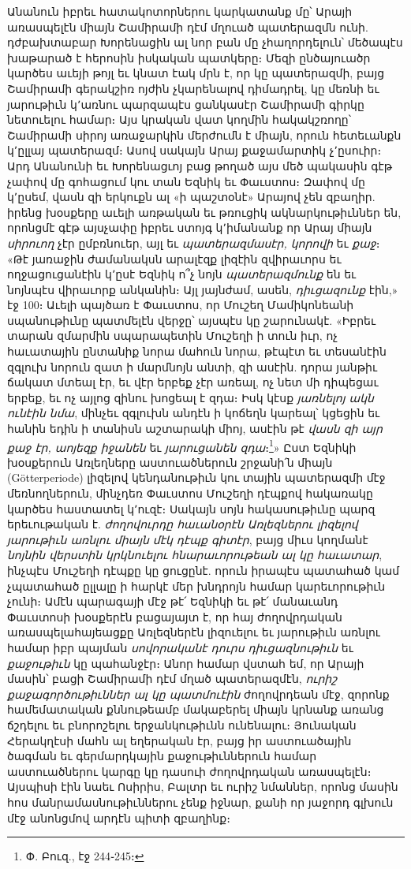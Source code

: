\documentclass{article}
\begin{document}
{Անանուն իբրեւ հատակոտորներու կարկատանք մը՝ Արայի առասպելէն միայն Շամիրամի դէմ մղուած պատերազմն ունի. դժբախտաբար Խորենացին ալ նոր բան մը չհաղորդելուն՝ մեծապէս խաթարած է հերոսին իսկական պատկերը։ Մեզի ընծայուածր կարծես աւեյի թոյլ եւ կնատ էակ մրն է, որ կը պատերազմի, բայց Շամիրամի գերակշիռ ոյժին չկարենալով դիմադրել, կը մեռնի եւ յարութիւն կ՚առնու պարզապէս ցանկասէր Շամիրամի գիրկը նետուելու համար։ Այս կրական վատ կողմին հակակշռողը՝ Շամիրամի սիրոյ առաջարկին մերժումն է միայն, որուն հետեւանքն կ՚ըլլայ պատերազմ։ Ասով սակայն Արայ քաջամարտիկ չ՚ըսուիր։ Արդ Անանունի եւ Խորենացւոյ բաց թողած այս մեծ պակասին գէթ չափով մը գոհացում կու տան Եզնիկ եւ Փաւստոս։ Զափով մը կ՚ըսեմ, վասն զի երկուքն ալ «ի պաշտօնէ» Արայով չեն զբաղիր. իրենց խօսքերը աւելի առթական եւ թռուցիկ ակնարկութիւններ են, որոնցմէ գէթ այսչափը իբրեւ ստոյգ կ՚իմանանք որ Արայ միայն \emph{սիրուող} չէր ըմբռնուեր, այլ եւ \emph{պատերազմասէր, կորովի} եւ \emph{քաջ}։ «Թէ յառաջին ժամանակսն արալէզք լիզէին զվիրաւորս եւ ողջացուցանէին կ՚ըսէ Եզնիկ ո՞չ նոյն \emph{պատերազմունք} են եւ նոյնպէս վիրաւորք անկանին։ Այլ յայնժամ, ասեն, \emph{դիւցազունք} էին,» էջ 100։ Աւելի պայծառ է Փաւստոս, որ Մուշեղ Մամիկոնեանի սպանութիւնը պատմելէն վերջը՝ այսպէս կը շարունակէ. «Իբրեւ տարան զմարմին սպարապետին Մուշեղի ի տուն իւր, ոչ հաւատային ընտանիք նորա մահուն նորա, թէպէտ եւ տեսանէին զգլուխ նորուն զատ ի մարմնոյն անտի, զի ասէին. դորա յանթիւ ճակատ մտեալ էր, եւ վէր երբեք չէր առեալ, ոչ նետ մի դիպեցաւ երբեք, եւ ոչ այլոց զինու խոցեալ է զդա։ Իսկ կէսք \emph{յառնելոյ ակն ունէին նմա}, մինչեւ զգլուխն անդէն ի կոճեղն կարեալ՝ կցեցին եւ հանին եդին ի տանիսն աշտարակի միոյ, ասէին թէ \emph{վասն զի այր քաջ էր, աոյեզք իջանեն} եւ \emph{յարուցանեն զդա}։\footnote{Փ. Բուզ., էջ 244֊245։}» Ըստ Եզնիկի խօսքերուն Առլեղները աստուածներուն շրջանի՛ն միայն (Götterperiode) լիզելով կենդանութիւն կու տային պատերազմի մէջ մեռնողներուն, մինչդեռ Փաւստոս Մուշեղի դէպքով հակառակը կարծես հաստատել կ՚ուզէ։ Սակայն սոյն հակասութիւնը պարզ երեւութական է. \emph{ժողովուրդը հաւանօրէն Առլեզներու լիզելով յարութիւն առնլու միայն մէկ դէպք գիտէր}, բայց միւս կողմանէ \emph{նոյնին վերստին կրկնուելու հնարաւորութեան ալ կը հաւատար}, ինչպէս Մուշեղի դէպքը կը ցուցընէ. որուն իրապէս պատահած կամ չպատահած ըլլալը ի հարկէ մեր խնդրոյն համար կարեւորութիւն չունի։ Ամէն պարագայի մէջ թէ՛ Եզնիկի եւ թէ՛ մանաւանդ Փաւստոսի խօսքերէն բացայայտ է, որ հայ ժողովրդական առասպելահայեացքը Առլեզներէն լիզուելու եւ յարութիւն առնլու համար իբր պայման \emph{սովորականէ դուրս դիւցազնութիւն} եւ \emph{քաջութիւն} կը պահանջէր։ Անոր համար վստահ եմ, որ Արայի մասին՝ բացի Շամիրամի դէմ մղած պատերազմէն, \emph{ուրիշ քաջագործութիւններ ալ կը պատմուէին} ժողովրդեան մէջ, զորոնք համեմատական քննութեամբ մակաբերել միայն կրնանք առանց ճշդելու եւ բնորոշելու երջանկութիւնն ունենալու։ Յունական Հերակղէսի մահն ալ եղերական էր, բայց իր աստուածային ծագման եւ գերմարդկային քաջութիւններուն համար աստուածներու կարգը կը դասուի ժողովրդական առասպելէն։ Այսպիսի էին նաեւ Ոսիրիս, Բալտր եւ ուրիշ նմաններ, որոնց մասին հոս մանրամասնութիւններու չենք իջնար, քանի որ յաջորդ գլխուն մէջ անոնցմով արդէն պիտի զբաղինք։

}
\end{document}
